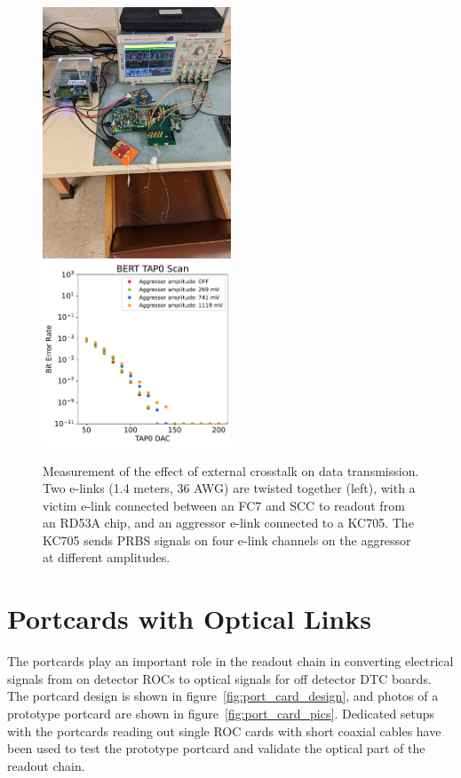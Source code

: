 \documentclass[a4paper,11pt]{article}
\begin{document}
\begin{figure}[htbp]
\centering
\includegraphics[width=0.5\textwidth,origin=c,angle=270]{../figures/external_crosstalk_setup.jpg}
\qquad
\includegraphics[width=0.5\textwidth,origin=c]{../figures/BERT_TAP0_Scan_External_Crosstalk.pdf}
\caption{
\label{fig:external_crosstalk}
Measurement of the effect of external crosstalk on data transmission.
Two e-links (1.4 meters, 36 AWG) are twisted together (left), with a victim e-link connected between an FC7 and SCC to readout from an RD53A chip, and an aggressor e-link connected to a KC705.
The KC705 sends PRBS signals on four e-link channels on the aggressor at different amplitudes.
}
\end{figure}

\section{Portcards with Optical Links}
\label{sec:optical}

The portcards play an important role in the readout chain in converting electrical signals from on detector ROCs to optical signals for off detector DTC boards.
The portcard design is shown in figure~\ref{fig:port_card_design}, and photos of a prototype portcard are shown in figure~\ref{fig:port_card_pics}.
Dedicated setups with the portcards reading out single ROC cards with short coaxial cables have been used to test the prototype portcard and validate the optical part of the readout chain.
\end{document}
